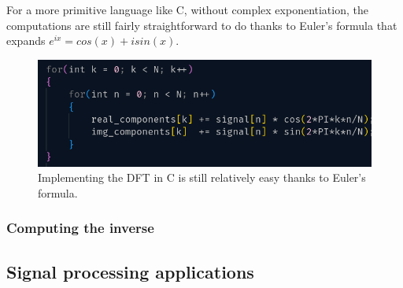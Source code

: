 For a more primitive language like C, without complex exponentiation, the computations are still fairly straightforward to do thanks to Euler's formula that expands $e^{ix} = cos(x) + isin(x)$.  

\begin{figure}[ht]
    \centering
    \includegraphics[width=\textwidth]{./images/cDFT.png}
    \caption{Implementing the DFT in C is still relatively easy thanks to Euler's formula. \label{fig:cDFT}}
\end{figure}

\subsubsection{Computing the inverse}

\subsection{Signal processing applications}





